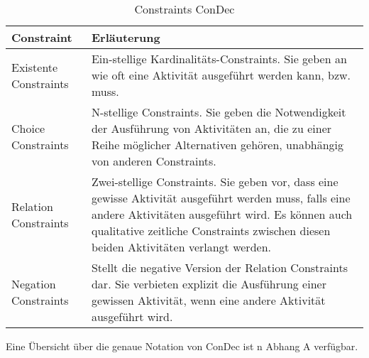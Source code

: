 \begin{table}
\begin{tabular}{|p{}|p{}|}
\hline
\textbf{Constraint} & \textbf{Erläuterung}\\
\hline
Existente Constraints & Ein-stellige Kardinalitäts-Constraints. Sie geben an wie oft eine Aktivität ausgeführt werden kann, bzw. muss.\\
\hline
Choice Constraints & N-stellige Constraints. Sie geben die Notwendigkeit der Ausführung von Aktivitäten an, die zu einer Reihe möglicher Alternativen gehören, unabhängig von anderen Constraints. \\
\hline
Relation Constraints & Zwei-stellige Constraints. Sie geben vor, dass eine gewisse Aktivität ausgeführt werden muss, falls eine andere Aktivitäten ausgeführt wird. Es können auch qualitative zeitliche Constraints zwischen diesen beiden Aktivitäten verlangt werden.\\
\hline
Negation Constraints & Stellt die negative Version der Relation Constraints dar. Sie verbieten explizit die Ausführung einer gewissen Aktivität, wenn eine andere Aktivität ausgeführt wird.\\
\hline
 \end{tabular}
  \caption{Constraints ConDec}
\label{tab:tab3}
 \end{table}
 
 Eine Übersicht über die genaue Notation von ConDec ist n Abhang A verfügbar.
 







